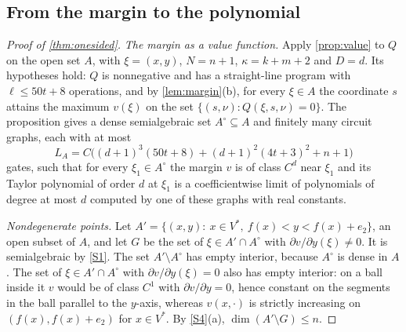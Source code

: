 \subsection{From the margin to the polynomial}\label{sec:universal-assembly}

\begin{proof}[Proof of \cref{thm:onesided}]
\emph{The margin as a value function.} Apply \cref{prop:value} to $Q$ on the open set $A$, with $\xi=(x,y)$, $N=n+1$, $\kappa=k+m+2$ and $D=d$. Its hypotheses hold: $Q$ is nonnegative and has a straight-line program with $\ell\le50t+8$ operations, and by \cref{lem:margin}(b), for every $\xi\in A$ the coordinate $s$ attains the maximum $v(\xi)$ on the set $\{(s,\nu):Q(\xi,s,\nu)=0\}$. The proposition gives a dense semialgebraic set $A^\circ\subseteq A$ and finitely many circuit graphs, each with at most
\[
L_A=C\bigl((d+1)^3(50t+8)+(d+1)^2(4t+3)^2+n+1\bigr)
\]
gates, such that for every $\xi_1\in A^\circ$ the margin $v$ is of class $C^d$ near $\xi_1$ and its Taylor polynomial of order $d$ at $\xi_1$ is a coefficientwise limit of polynomials of degree at most $d$ computed by one of these graphs with real constants.

\emph{Nondegenerate points.} Let $A'=\{(x,y):\ x\in V^*,\ f(x)<y<f(x)+e_2\}$, an open subset of $A$, and let $G$ be the set of $\xi\in A'\cap A^\circ$ with $\partial v/\partial y(\xi)\ne0$. It is semialgebraic by \ref{S1}. The set $A'\setminus A^\circ$ has empty interior, because $A^\circ$ is dense in $A$. The set of $\xi\in A'\cap A^\circ$ with $\partial v/\partial y(\xi)=0$ also has empty interior: on a ball inside it $v$ would be of class $C^1$ with $\partial v/\partial y=0$, hence constant on the segments in the ball parallel to the $y$-axis, whereas $v(x,\cdot)$ is strictly increasing on $(f(x),f(x)+e_2)$ for $x\in V^*$. By \ref{S4}(a), $\dim(A'\setminus G)\le n$.


\end{proof}
